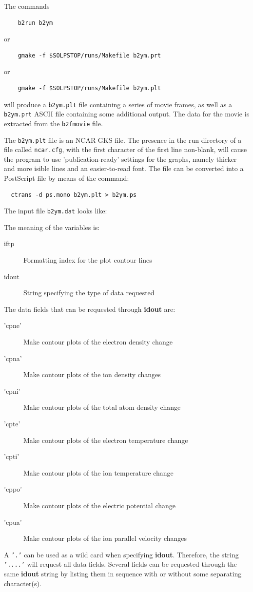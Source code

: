 \documentclass[a4paper,10pt]{report}
\begin{document}
The commands
\begin{verbatim}
    b2run b2ym
\end{verbatim}
or
\begin{verbatim}
    gmake -f $SOLPSTOP/runs/Makefile b2ym.prt
\end{verbatim}
or
\begin{verbatim}
    gmake -f $SOLPSTOP/runs/Makefile b2ym.plt
\end{verbatim}
will produce a {\tt b2ym.plt} file containing a series of movie frames,
as well as a {\tt b2ym.prt} ASCII file containing some additional output.
The data for the movie is extracted from the {\tt b2fmovie} file.

The {\tt b2ym.plt} file is an NCAR GKS file. The presence in the run directory of a file
called {\tt ncar.cfg}, with the first character of the first line non-blank, will cause
the program to use 'publication-ready' settings for the graphs, namely thicker and more
isible lines and an easier-to-read font. The file can be converted into
a PostScript file by means of the command:
\begin{verbatim}
  ctrans -d ps.mono b2ym.plt > b2ym.ps
\end{verbatim}

The input file {\tt b2ym.dat} looks like:

The meaning of the variables is:
\begin{description}
  \item[iftp] Formatting index for the plot contour lines
  \item[idout] String specifying the type of data requested
\end{description}

The data fields that can be requested through {\bf idout} are:
\begin{description}
  \item['cpne'] Make contour plots of the electron density change
  \item['cpna'] Make contour plots of the ion density changes
  \item['cpni'] Make contour plots of the total atom density change
  \item['cpte'] Make contour plots of the electron temperature change
  \item['cpti'] Make contour plots of the ion temperature change
  \item['cppo'] Make contour plots of the electric potential change
  \item['cpua'] Make contour plots of the ion parallel velocity changes
\end{description}
A {\tt '.'} can be used as a wild card when specifying {\bf idout}.
Therefore, the string {\tt '....'} will request all data fields.
Several fields can be requested through the same {\bf idout} string by listing them
in sequence with or without some separating character(s).
\end{document}
